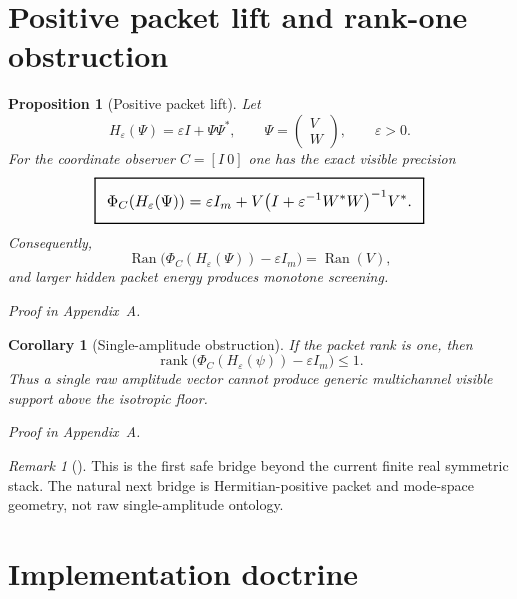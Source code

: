 \documentclass[11pt,a4paper]{article}
\numberwithin{equation}{section}
\DeclareMathOperator{\rank}{rank}
\DeclareMathOperator{\Ran}{Ran}
\newcommand{\geomboxed}[1]{%
  \setlength{\fboxsep}{8pt}%
  \setlength{\fboxrule}{0.9pt}%
  \fbox{\scalebox{1.12}{$\displaystyle #1$}}%
}
\theoremstyle{thmcompact}
\newtheorem{proposition}[theorem]{Proposition}
\newtheorem{corollary}[theorem]{Corollary}
\theoremstyle{remark}
\newtheorem*{remarkplain}{Remark}
\newenvironment{remark}[1][]%
{\begin{remarkbox}\begin{remarkplain}[#1]\normalfont}
{\end{remarkplain}\end{remarkbox}}
\newcommand{\proofappendix}{\par{\hfill\scriptsize\emph{Proof in Appendix~A.}}\par}
\begin{document}
\section{Positive packet lift and rank-one obstruction}

\begin{proposition}[Positive packet lift]
\label{prop:packet-lift}
Let
\begin{equation}
H_\varepsilon(\Psi)=\varepsilon I+\Psi\Psi^*,
\qquad
\Psi=
\begin{pmatrix}
V\\
W
\end{pmatrix},
\qquad \varepsilon>0.
\end{equation}
For the coordinate observer $C=[I\ 0]$ one has the exact visible precision
\begin{equation}
\geomboxed{\Phi_C(H_\varepsilon(\Psi))
=
\varepsilon I_m+V\bigl(I+\varepsilon^{-1}W^*W\bigr)^{-1}V^*.}
\end{equation}
Consequently,
\begin{equation}
\Ran\bigl(\Phi_C(H_\varepsilon(\Psi))-\varepsilon I_m\bigr)=\Ran(V),
\end{equation}
and larger hidden packet energy produces monotone screening.
\end{proposition}

\proofappendix

\begin{corollary}[Single-amplitude obstruction]
\label{cor:rank-one-packet-obstruction}
If the packet rank is one, then
\begin{equation}
\rank\bigl(\Phi_C(H_\varepsilon(\psi))-\varepsilon I_m\bigr)\le 1.
\end{equation}
Thus a single raw amplitude vector cannot produce generic multichannel visible support above the isotropic floor.
\end{corollary}

\proofappendix

\begin{remark}
This is the first safe bridge beyond the current finite real symmetric stack. The natural next bridge is Hermitian-positive packet and mode-space geometry, not raw single-amplitude ontology.
\end{remark}

\section{Implementation doctrine}
\end{document}
